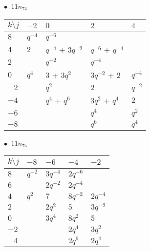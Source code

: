 \begin{minipage}{\linewidth}
$\bullet\ $ $11n_{74}$ \vspace{0.5em} \\
\begin{tabular}{l|llll}
$k \setminus j$ & $-2$ & $0$ & $2$ & $4$ \\
\hline
$8$ & $q^{-4}$ & $q^{-6}$ &  &  \\
$4$ & $2$ & $q^{-4}$ + $3q^{-2}$ & $q^{-6}$ + $q^{-4}$ &  \\
$2$ &  & $q^{-2}$ & $q^{-4}$ &  \\
$0$ & $q^{4}$ & $3$ + $3q^{2}$ & $3q^{-2}$ + $2$ & $q^{-4}$ \\
$-2$ &  & $q^{2}$ & $2$ & $q^{-2}$ \\
$-4$ &  & $q^{4}$ + $q^{6}$ & $3q^{2}$ + $q^{4}$ & $2$ \\
$-6$ &  &  & $q^{4}$ & $q^{2}$ \\
$-8$ &  &  & $q^{6}$ & $q^{4}$ \\
\end{tabular}
\vspace{2em}
\end{minipage}
%
\begin{minipage}{\linewidth}
$\bullet\ $ $11n_{75}$ \vspace{0.5em} \\
\begin{tabular}{l|llll}
$k \setminus j$ & $-8$ & $-6$ & $-4$ & $-2$ \\
\hline
$8$ & $q^{-2}$ & $3q^{-4}$ & $2q^{-6}$ &  \\
$6$ &  & $2q^{-2}$ & $2q^{-4}$ &  \\
$4$ & $q^{2}$ & $7$ & $8q^{-2}$ & $2q^{-4}$ \\
$2$ &  & $2q^{2}$ & $5$ & $3q^{-2}$ \\
$0$ &  & $3q^{4}$ & $8q^{2}$ & $5$ \\
$-2$ &  &  & $2q^{4}$ & $3q^{2}$ \\
$-4$ &  &  & $2q^{6}$ & $2q^{4}$ \\
\end{tabular}
\vspace{2em}
\end{minipage}
%
